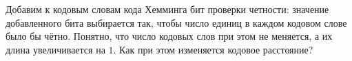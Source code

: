 Добавим к кодовым словам кода Хемминга бит проверки четности: значение добавленного бита выбирается так,
чтобы число единиц в каждом кодовом слове было бы чётно. Понятно, что число кодовых слов при этом не
меняется, а их длина увеличивается на $1$. Как при этом изменяется кодовое расстояние?
